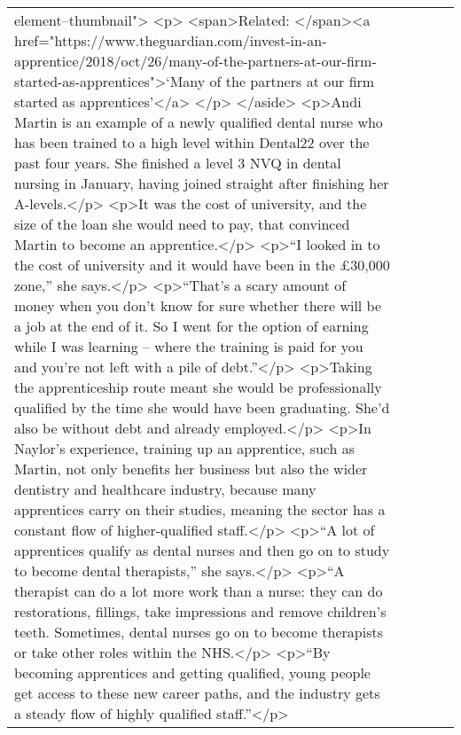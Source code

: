 \documentclass[]{article}
\begin{document}
\begin{table}[!h]
{\begin{tabular}[t]{lllll}
element--thumbnail"> <p> <span>Related: </span><a href="https://www.theguardian.com/invest-in-an-apprentice/2018/oct/26/many-of-the-partners-at-our-firm-started-as-apprentices">‘Many of the partners at our firm started as apprentices’</a> </p> </aside>  <p>Andi Martin is an example of a newly qualified dental nurse who has been trained to a high level within Dental22 over the past four years. She finished a level 3 NVQ in dental nursing in January, having joined straight after finishing her A-levels.</p> <p>It was the cost of university, and the size of the loan she would need to pay, that convinced Martin to become an apprentice.</p> <p>“I looked in to the cost of university and it would have been in the £30,000 zone,” she says.</p> <p>“That’s a scary amount of money when you don’t know for sure whether there will be a job at the end of it. So I went for the option of earning while I was learning – where the training is paid for you and you’re not left with a pile of debt.”</p> <p>Taking the apprenticeship route meant she would be professionally qualified by the time she would have been graduating. She’d also be without debt and already employed.</p> <p>In Naylor’s experience, training up an apprentice, such as Martin, not only benefits her business but also the wider dentistry and healthcare industry, because many apprentices carry on their studies, meaning the sector has a constant flow of higher-qualified staff.</p> <p>“A lot of apprentices qualify as dental nurses and then go on to study to become dental therapists,” she says.</p> <p>“A therapist can do a lot more work than a nurse: they can do restorations, fillings, take impressions and remove children’s teeth. Sometimes, dental nurses go on to become therapists or take other roles within the NHS.</p> <p>“By becoming apprentices and getting qualified, young people get access to these new career paths, and the industry gets a steady flow of highly qualified staff.”</p>\\

\end{tabular}}
\end{table}
\end{document}
